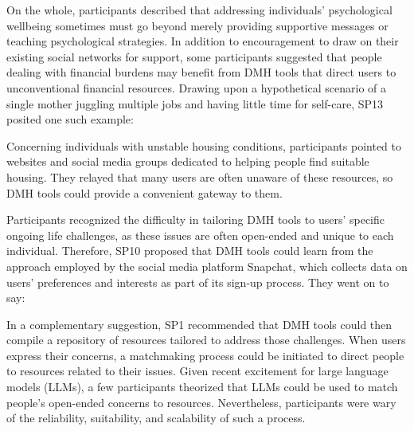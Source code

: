 On the whole, participants described that addressing individuals' psychological wellbeing sometimes must go beyond merely providing supportive messages or teaching psychological strategies. In addition to encouragement to draw on their existing social networks for support, some participants suggested that people dealing with financial burdens may benefit from DMH tools that direct users to unconventional financial resources. Drawing upon a hypothetical scenario of a single mother juggling multiple jobs and having little time for self-care, SP13 posited one such example:


\noindent
Concerning individuals with unstable housing conditions, participants pointed to websites and social media groups dedicated to helping people find suitable housing. They relayed that many users are often unaware of these resources, so DMH tools could provide a convenient gateway to them. 

Participants recognized the difficulty in tailoring DMH tools to users' specific ongoing life challenges, as these issues are often open-ended and unique to each individual. Therefore, %
SP10 proposed that DMH tools could learn from the approach employed by the social media platform Snapchat, which collects data on users' preferences and interests as part of its sign-up process. They went on to say: %


In a complementary suggestion, SP1 recommended that DMH tools could then compile a repository of resources tailored to address those challenges. When users express their concerns, a matchmaking process could be initiated to direct people to resources related to their issues. Given recent excitement for large language models (LLMs), a few participants theorized that LLMs could be used to match people's open-ended concerns to resources. Nevertheless, participants were wary of the reliability, suitability, and scalability of such a process.


